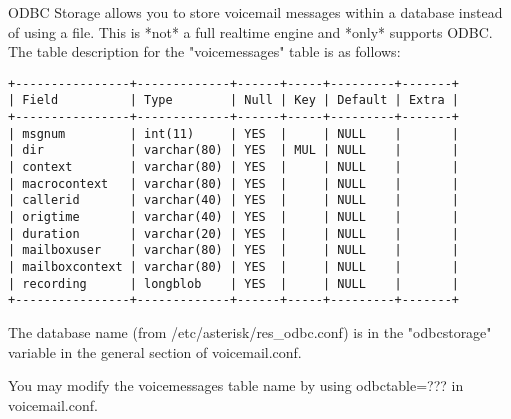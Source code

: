 ODBC Storage allows you to store voicemail messages within a database 
instead of using a file.  This is *not* a full realtime engine and 
*only* supports ODBC.  The table description for the "voicemessages" 
table is as follows:

\begin{verbatim}
+----------------+-------------+------+-----+---------+-------+
| Field          | Type        | Null | Key | Default | Extra |
+----------------+-------------+------+-----+---------+-------+
| msgnum         | int(11)     | YES  |     | NULL    |       |
| dir            | varchar(80) | YES  | MUL | NULL    |       |
| context        | varchar(80) | YES  |     | NULL    |       |
| macrocontext   | varchar(80) | YES  |     | NULL    |       |
| callerid       | varchar(40) | YES  |     | NULL    |       |
| origtime       | varchar(40) | YES  |     | NULL    |       |
| duration       | varchar(20) | YES  |     | NULL    |       |
| mailboxuser    | varchar(80) | YES  |     | NULL    |       |
| mailboxcontext | varchar(80) | YES  |     | NULL    |       |
| recording      | longblob    | YES  |     | NULL    |       |
+----------------+-------------+------+-----+---------+-------+
\end{verbatim}

The database name (from /etc/asterisk/res\_odbc.conf) is in the 
"odbcstorage" variable in the general section of voicemail.conf.

You may modify the voicemessages table name by using 
odbctable=??? in voicemail.conf.


